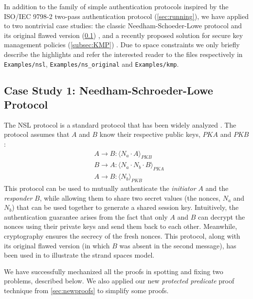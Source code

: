 In addition to the family of simple authentication protocols inspired by the ISO/IEC 9798-2 two-pass authentication protocol (\cref{sec:running}), we have applied \easystrands{} to two nontrivial case studies:
the classic Needham-Schoeder-Lowe protocol and its original flawed version (\cref{subsec:NSL}) \cite{lowe1995attack}, and a recently proposed solution for secure key management policies (\cref{subsec:KMP}) \cite{focardi2021secure}.
Due to space constraints we only briefly describe the highlights and refer the interested reader to the files respectively in \lstinline{Examples/nsl}, \lstinline{Examples/ns_original} and \lstinline{Examples/kmp}.

\subsection{Case Study 1: Needham-Schroeder-Lowe Protocol}\label{subsec:NSL}
The NSL protocol is a standard protocol that has been widely analyzed \cite{lowe1995attack}.
The protocol assumes that $A$ and $B$ know their respective public keys, $\mathit{PK} A$ and $\mathit{PK} B$:
\begin{align*}
    &A \rightarrow B: \langle N_a \cdot A \rangle_{\mathit{PK} B}\\
    &B \rightarrow A: \langle N_a \cdot N_b \cdot B \rangle_{\mathit{PK} A}\\
    &A \rightarrow B: \langle N_b \rangle_{\mathit{PK} B}
\end{align*}
This protocol can be used to mutually authenticate the \emph{initiator} $A$ and the \emph{responder} $B$, while allowing them to share two secret values (the nonces, $N_a$ and $N_b$) that can be used together to generate a shared session key.
Intuitively, the authentication guarantee arises from the fact that only $A$ and $B$ can decrypt the nonces using their private keys and send them back to each other. Meanwhile, cryptography ensures the secrecy of the fresh nonces. This protocol, along with its original flawed version (in which $B$ was absent in the second message), has been used in \cite{FHG98} to illustrate the strand spaces model.

 We have successfully mechanized all the proofs in \cite{FHG98} spotting and fixing two problems, described below. We also applied our new \emph{protected predicate} proof technique from \cref{sec:newproofs} to simplify some proofs.

